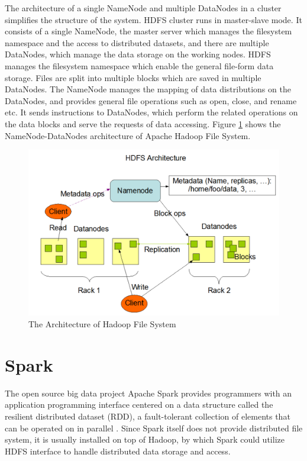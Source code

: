The architecture of a single NameNode and multiple DataNodes in a cluster simplifies the structure of the system. HDFS cluster runs in master-slave mode.  It consists of a single NameNode, the master server which manages the filesystem namespace and the access to distributed datasets, and there are multiple DataNodes, which manage the data storage on the working nodes. HDFS manages the filesystem namespace which enable the general file-form data storage. Files are split into multiple blocks which are saved in multiple DataNodes. The NameNode manages the mapping of data distributions on the DataNodes, and provides general file operations such as open, close, and rename etc. It sends instructions to DataNodes, which perform the related operations on the data blocks and serve the requests of data accessing. Figure \ref{HDFSArch} shows the NameNode-DataNodes architecture of Apache Hadoop File System.

\begin{figure}[h]
\centering
\includegraphics[scale=0.5]{figures/HDFSArch.png}
\caption{The Architecture of Hadoop File System \cite{ApacheHadoop}}
\label{HDFSArch}
\end{figure}

\section{Spark}

The open source big data project Apache Spark provides programmers with an application programming interface centered on a data structure called the resilient distributed dataset (RDD), a fault-tolerant collection of elements that can be operated on in parallel \cite{ApacheSpark}. Since Spark itself does not provide distributed file system, it is usually installed on top of Hadoop, by which Spark could utilize HDFS interface to handle distributed data storage and access. 


